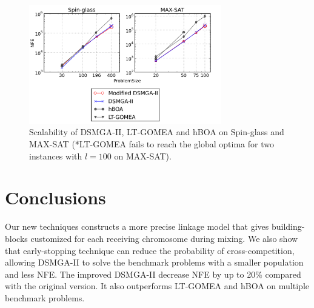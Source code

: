 \documentclass{sig-alternate-05-2015}
\begin{document}
\begin{figure}
\centering
\includegraphics[width=3.3in]{spin_satResults}
\caption{Scalability of DSMGA-II, LT-GOMEA and hBOA on Spin-glass and MAX-SAT (*LT-GOMEA fails to reach the global optima for two instances with $l=100$ on MAX-SAT).}
\end{figure}




\section{Conclusions}
Our new techniques constructs a more precise linkage model that gives building-blocks customized for each receiving chromosome during mixing. We also show that early-stopping technique can reduce the probability of cross-competition, allowing DSMGA-II to solve the benchmark problems with a smaller population and less NFE. The improved DSMGA-II decrease NFE by up to 20\% compared with the original version. It also outperforms LT-GOMEA and hBOA on multiple benchmark problems. 


%

%
%
\end{document}

